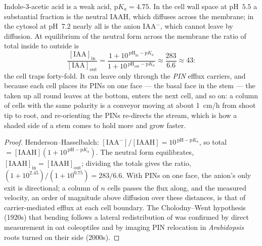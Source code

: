 \begin{theorem}\label{thm:b3:plant-molecular-physiology:auxin}
Indole-3-acetic acid is a weak acid, $\mathrm{p}K_{a} = 4.75$. In the
cell wall space at pH~$5.5$ a substantial fraction is the neutral
IAAH, which diffuses across the membrane; in the cytosol at pH~$7.2$
nearly all is the anion IAA$^{-}$, which cannot leave by diffusion. At
equilibrium of the neutral form across the membrane the ratio of total
 inside to outside is
\[
\frac{[\text{IAA}]_{\text{in}}}{[\text{IAA}]_{\text{out}}}
= \frac{1 + 10^{\,\mathrm{pH}_{\text{in}} - \mathrm{p}K_{a}}}{1 + 10^{\,\mathrm{pH}_{\text{out}} - \mathrm{p}K_{a}}}
\approx \frac{283}{6.6} \approx 43 :
\]
the cell traps  forty-fold. It can leave only through the
\emph{PIN} efflux carriers, and because each cell places its PINs on one
face --- the basal face in the stem --- the  taken up all round
leaves at the bottom, enters the next cell, and so on: a column of
cells with the same polarity is a conveyor moving  at about
\qty{1}{cm/h} from shoot tip to root, and re-orienting the PINs
re-directs the stream, which is how a shaded side of a stem comes to
hold more  and grow faster.
\end{theorem}
\begin{proof}
Henderson--Hasselbalch: $[\text{IAA}^{-}]/[\text{IAAH}] = 10^{\,\mathrm{pH}
- \mathrm{p}K_{a}}$, so total $= [\text{IAAH}](1 + 10^{\,\mathrm{pH} -
\mathrm{p}K_{a}})$. The neutral form equilibrates, $[\text{IAAH}]_{\text{in}}
= [\text{IAAH}]_{\text{out}}$; dividing the totals gives the ratio,
$(1 + 10^{2.45})/(1 + 10^{0.75}) = 283/6.6$. With PINs on one face,
the anion's only exit is directional; a column of $n$ cells passes the
flux along, and the measured velocity, an order of magnitude above
diffusion over these distances, is that of carrier-mediated efflux at
each cell boundary. The Cholodny--Went hypothesis (1920s) that bending
follows a lateral redistribution of  was confirmed by direct
measurement in oat coleoptiles and by imaging PIN relocation in
\emph{Arabidopsis} roots turned on their side (2000s).
\end{proof}

